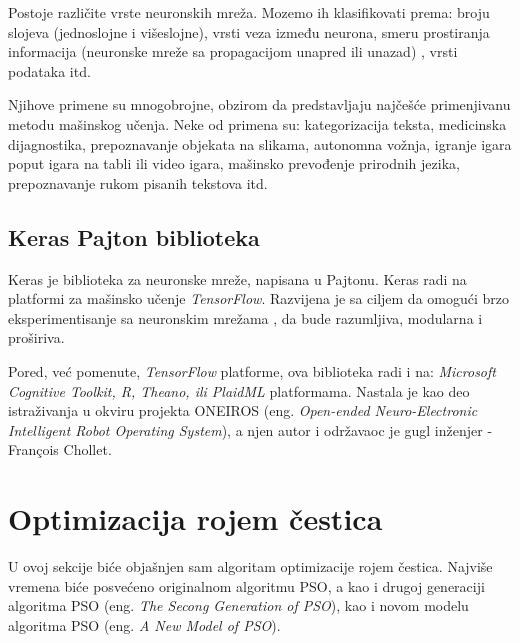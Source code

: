 \documentclass[a4paper]{article}
\begin{document}
{Postoje različite vrste neuronskih mreža. Mozemo ih klasifikovati prema: broju slojeva (jednoslojne i višeslojne), vrsti veza između neurona, smeru
prostiranja informacija (neuronske mreže sa propagacijom unapred ili unazad) \cite{website}, vrsti podataka itd. 

Njihove primene su mnogobrojne, obzirom da predstavljaju najčešće primenjivanu metodu mašinskog učenja. Neke od primena su: kategorizacija teksta,
medicinska dijagnostika, prepoznavanje objekata na slikama, autonomna vožnja, igranje igara poput igara na tabli ili video igara, mašinsko prevođenje
prirodnih jezika, prepoznavanje rukom pisanih tekstova itd. 

\subsection{Keras Pajton biblioteka}
\label{subsec:keras}

Keras je biblioteka za neuronske mreže, napisana u Pajtonu. Keras radi na platformi za mašinsko učenje  \textit{TensorFlow}.
Razvijena je sa ciljem da omogući brzo eksperimentisanje sa neuronskim mrežama \cite{keraswebsite},
da bude razumljiva, modularna i proširiva.

Pored, već pomenute, \textit{TensorFlow} platforme, ova biblioteka radi i na: \textit{Microsoft Cognitive Toolkit, R, Theano, ili PlaidML} platformama. 
Nastala je kao deo istraživanja u okviru projekta ONEIROS (eng. \emph{Open-ended Neuro-Electronic Intelligent Robot Operating System}), 
a njen autor i održavaoc je gugl inženjer -  François Chollet.

\section{Optimizacija rojem čestica}
\label{subsec:pso}
U ovoj sekcije biće objašnjen sam algoritam optimizacije rojem čestica. Najviše vremena biće posvećeno originalnom algoritmu PSO,
a kao i drugoj generaciji algoritma PSO (eng. \textit{The Secong Generation of PSO}), kao i novom modelu algoritma PSO 
(eng. \textit{A New Model of PSO}).


}
\end{document}
